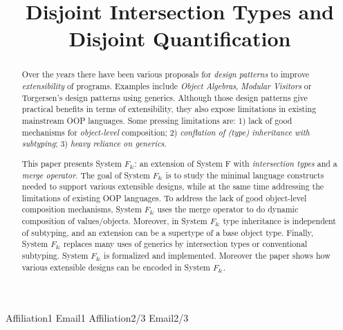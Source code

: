 \documentclass[nocopyrightspace,preprint,times,9pt]{sigplanconf}
\newcommand{\name}{{\bf $F_{\&}$}\xspace}
\begin{document}
\setlength{\pdfpageheight}{\paperheight}
\setlength{\pdfpagewidth}{\paperwidth}


\preprintfooter{\name}                        %

\title{Disjoint Intersection Types and Disjoint Quantification}

           {Affiliation1}
           {Email1}
           {Affiliation2/3}
           {Email2/3}

\maketitle

\begin{abstract}

  Over the years there have been various proposals for \emph{design
    patterns} to improve \emph{extensibility} of programs.
  Examples include \emph{Object Algebras}, \emph{Modular Visitors} or
  Torgersen's design patterns using generics.
  Although those design patterns give practical
  benefits in terms of extensibility, they also expose limitations in
  existing mainstream OOP languages. Some pressing
  limitations are: 1) lack of good mechanisms for
  \emph{object-level} composition; 2) \emph{conflation of
    (type) inheritance with subtyping}; 3) \emph{heavy reliance on generics}.

  This paper presents System \name: an extension of System F with
  \emph{intersection types} and a \emph{merge operator}.  The goal of System \name
  is to study the minimal language constructs needed to support
  various extensible designs, while at the same time addressing the
  limitations of existing OOP languages. To address the lack of good
  object-level composition mechanisms, System \name uses the merge
  operator to do dynamic composition of values/objects. Moreover, in
  System \name type inheritance is independent of subtyping, and an
  extension can be a supertype of a base object type.  Finally, System
  \name replaces many uses of generics by intersection types or
  conventional subtyping. System \name is formalized and
  implemented. Moreover the paper shows how various extensible designs
  can be encoded in System \name.

\end{abstract}
\end{document}

